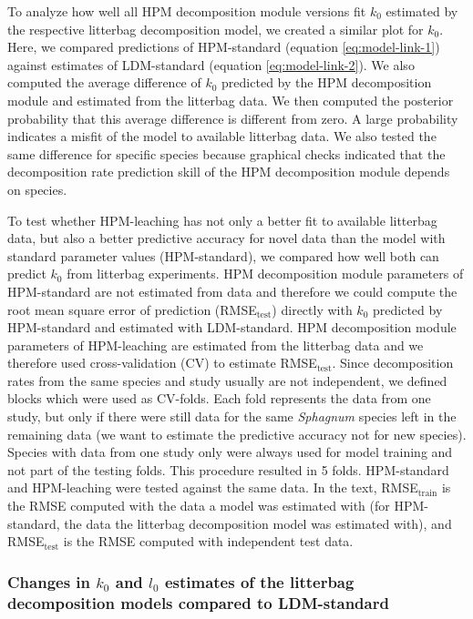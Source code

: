 \documentclass[esd, manuscript]{copernicus}
\begin{document}
To analyze how well all HPM decomposition module versions fit \(k_0\) estimated by the respective litterbag decomposition model, we created a similar plot for \(k_0\). Here, we compared predictions of HPM-standard (equation \eqref{eq:model-link-1}) against estimates of LDM-standard (equation \eqref{eq:model-link-2}). We also computed the average difference of \(k_0\) predicted by the HPM decomposition module and estimated from the litterbag data. We then computed the posterior probability that this average difference is different from zero. A large probability indicates a misfit of the model to available litterbag data. We also tested the same difference for specific species because graphical checks indicated that the decomposition rate prediction skill of the HPM decomposition module depends on species.

To test whether HPM-leaching has not only a better fit to available litterbag data, but also a better predictive accuracy for novel data than the model with standard parameter values (HPM-standard), we compared how well both can predict \(k_0\) from litterbag experiments. HPM decomposition module parameters of HPM-standard are not estimated from data and therefore we could compute the root mean square error of prediction (RMSE\(_\text{test}\)) directly with \(k_0\) predicted by HPM-standard and estimated with LDM-standard. HPM decomposition module parameters of HPM-leaching are estimated from the litterbag data and we therefore used cross-validation (CV) to estimate RMSE\(_\text{test}\). Since decomposition rates from the same species and study usually are not independent, we defined blocks which were used as CV-folds. Each fold represents the data from one study, but only if there were still data for the same \emph{Sphagnum} species left in the remaining data (we want to estimate the predictive accuracy not for new species). Species with data from one study only were always used for model training and not part of the testing folds. This procedure resulted in 5 folds. HPM-standard and HPM-leaching were tested against the same data. In the text, RMSE\(_\text{train}\) is the RMSE computed with the data a model was estimated with (for HPM-standard, the data the litterbag decomposition model was estimated with), and RMSE\(_\text{test}\) is the RMSE computed with independent test data.

\subsubsection{\texorpdfstring{Changes in \(k_0\) and \(l_0\) estimates of the litterbag decomposition models compared to LDM-standard}{Changes in k\_0 and l\_0 estimates of the litterbag decomposition models compared to LDM-standard}}
\end{document}
